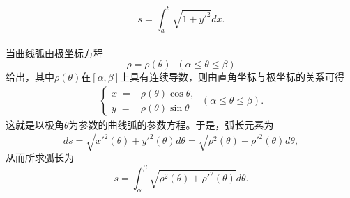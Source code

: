 \begin{equation}
  s = \int_a^b\sqrt{1+y'^2}dx.
\end{equation}

\paragraph{}
当曲线弧由极坐标方程
\begin{equation}
  \rho = \rho(\theta) \;\; (\alpha \leq \theta \leq \beta)
\end{equation}
给出，其中$\rho(\theta)$在$[\alpha,\beta]$上具有连续导数，则由直角坐标与极坐标的关系可得
\begin{align}
  \left\{\begin{array}{ll}
    x \;= & \rho(\theta)\cos\theta, \\
    y \;= & \rho(\theta)\sin\theta
    \end{array}\right. \; (\alpha \leq \theta \leq \beta).
\end{align}
这就是以极角$\theta$为参数的曲线弧的参数方程。于是，弧长元素为
\begin{equation}
  ds = \sqrt{x'^2(\theta) + y'^2(\theta)}d\theta = \sqrt{\rho^2(\theta) + \rho'^2(\theta)}d\theta,
\end{equation}
从而所求弧长为
\begin{equation}
  s = \int_\alpha^\beta\sqrt{\rho^2(\theta) + \rho'^2(\theta)}d\theta.
\end{equation}
